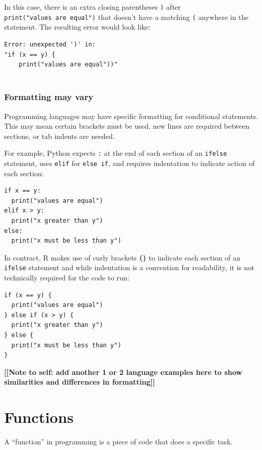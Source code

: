 \documentclass[
]{book}
\begin{document}
In this case, there is an extra closing parentheses \texttt{)} after \texttt{print("values\ are\ equal")} that doesn't have a matching \texttt{(} anywhere in the statement. The resulting error would look like:

\begin{verbatim}
Error: unexpected ')' in:
"if (x == y) {
    print("values are equal"))"
    
\end{verbatim}

\subsection{Formatting may vary}\label{formatting-may-vary}

Programming languages may have specific formatting for conditional statements. This may mean certain brackets must be used, new lines are required between sections, or tab indents are needed.

For example, Python expects \texttt{:} at the end of each section of an \texttt{ifelse} statement, uses \texttt{elif} for \texttt{else\ if}, and requires indentation to indicate action of each section:

\begin{verbatim}
if x == y:
  print("values are equal")
elif x > y:
  print("x greater than y")
else:
  print("x must be less than y")
\end{verbatim}

In contract, R makes use of curly brackets \texttt{\{\}} to indicate each section of an \texttt{ifelse} statement and while indentation is a convention for readability, it is not technically required for the code to run:

\begin{verbatim}
if (x == y) {
  print("values are equal")
} else if (x > y) {
  print("x greater than y")
} else {
  print("x must be less than y")
}
\end{verbatim}

\textbf{{[}{[}Note to self: add another 1 or 2 language examples here to show similarities and differences in formatting{]}{]}}

\chapter{Functions}\label{functions}

A ``function'' in programming is a piece of code that does a specific task.
\end{document}
